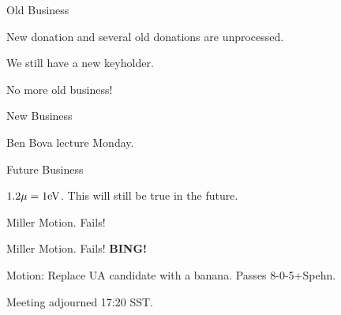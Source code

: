 \documentclass[12pt]{article}
\begin{document}

\vskip 12pt

\centerline{Old Business}

\vskip 12pt

New donation and several old donations are unprocessed.

We still have a new keyholder.

No more old business!

\vskip 12pt

\centerline{New Business}

Ben Bova lecture Monday.


\vskip 12pt

\centerline{Future Business}

$1.2\mu = 1 {\rm eV}$.  This will still be true in the future.

Miller Motion.  Fails!

Miller Motion.  Fails!  {\bf BING!}

Motion: Replace UA candidate with a banana. Passes \hbox{8-0-5+Spehn}.

Meeting adjourned 17:20 SST.
\end{document}
